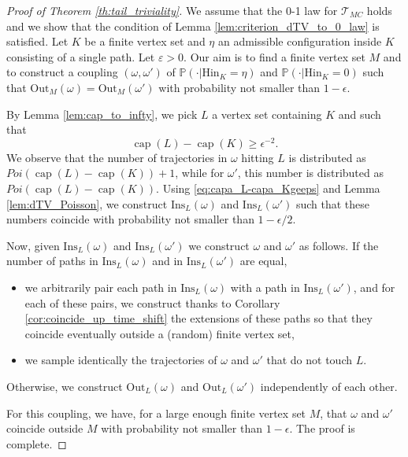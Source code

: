 \documentclass[12pt,a4paper]{article}
\newtheorem{remark}[theo]{Remark}
\newcommand{\1}[1]{{\mathbf 1}{\{#1\}}}
\newcommand{\8}{{\infty}}
\newcommand{\gep}{\varepsilon}
\newcommand{\p}{\mathbb{P}}
\newcommand{\capa}{\mathop{\mathrm{cap}}}
\newcommand{\Out}{\mathrm{Out}}
\newcommand{\In}{\mathrm{Ins}}
\newcommand{\Hin}{\mathrm{Hin}}
\begin{document}
\begin{proof}[Proof of Theorem \ref{th:tail_triviality}]
  We assume that the 0-1 law for $\mathcal{T}_{MC}$ holds and we show that the condition of Lemma \ref{lem:criterion_dTV_to_0_law} is satisfied. Let $K$ be a finite vertex set and $\eta$ an admissible configuration inside $K$ consisting of a single path. 
  Let $\gep>0$. 
  Our aim is to find a finite vertex set $M$ and to construct a coupling $(\omega, \omega')$ of $\p( \cdot | \Hin_K =\eta)$ and $\p( \cdot | \Hin_K = 0 )$ such that $\Out_M(\omega)=\Out_M(\omega')$ with probability not smaller than $1-\epsilon$.

  By Lemma \ref{lem:cap_to_infty}, we pick $L$ a vertex set containing $K$ and such that 
  \begin{equation}\label{eq:capa_L-capa_Kgeeps}
  \capa(L)-\capa(K)\ge \epsilon^{-2}.
  \end{equation}
  We observe that the number of trajectories in $\omega$ hitting $L$ is distributed as $Poi(\capa(L)-\capa(K))+1$, while for $\omega'$, this number is distributed as $Poi(\capa(L)-\capa(K))$. Using \eqref{eq:capa_L-capa_Kgeeps} and Lemma \ref{lem:dTV_Poisson}, we construct $\In_L(\omega)$ and $\In_L(\omega')$ such that these numbers coincide with probability not smaller than $1- \epsilon / 2$. 
 
  Now, given $\In_L(\omega)$ and $\In_L(\omega')$ we construct $\omega$ and $\omega'$ as follows.
  If the number of paths in $\In_L(\omega)$ and in $\In_L(\omega')$ are equal,
  \begin{itemize}
    \item we arbitrarily pair each path in $\In_L(\omega)$ with a path in $\In_L(\omega')$, and for each of these pairs, we construct thanks to Corollary \ref{cor:coincide_up_time_shift} the extensions of these paths so that they coincide eventually outside a (random) finite vertex set,
    \item we sample identically the trajectories of $\omega$ and $\omega'$ that do not touch $L$.
  \end{itemize}
 Otherwise, we construct $\Out_L(\omega)$ and $\Out_L(\omega')$ independently of each other.

 For this coupling, we have, for a large enough finite vertex set $M$, that $\omega$ and $\omega'$ coincide outside $M$ with probability not smaller than $1-\epsilon$. The proof is complete.
\end{proof}
  
\end{document}
